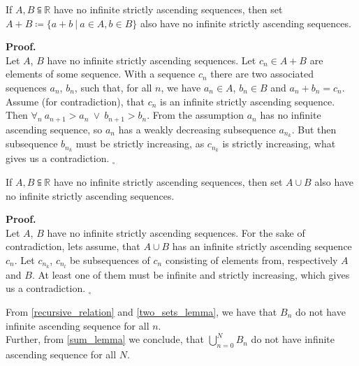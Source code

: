 \begin{lemma}\label{two_sets_lemma}
If $A, B \subseteqq \mathbb{R}$ have no infinite strictly ascending sequences, then set 
$A + B \coloneqq \{a+b\ |\ a \in A, b \in B\}$ also have no infinite strictly ascending sequences. 
\end{lemma}
\noindent\textbf{Proof.} \\
Let $A$, $B$ have no infinite strictly ascending sequences. 
Let $c_n \in A + B$ are elements of some sequence. With a sequence $c_n$ there are 
two associated sequences $a_n$, $b_n$, such that, for all $n$, we have $a_n \in A$, 
$b_n \in B$ and 
$a_n + b_n = c_n$. Assume (for contradiction), that $c_n$ is an infinite strictly 
ascending sequence. 
Then $\forall_n\ a_{n+1}>a_n\ \lor\ b_{n+1} > b_n$. From the assumption $a_n$ has no infinite 
ascending sequence, so $a_n$ has a weakly decreasing subsequence $a_{n_k}$. But then 
subsequence $b_{n_k}$ must be strictly increasing, as $c_{n_k}$ is strictly increasing, what gives 
us a contradiction. 
$_\square$ 

\begin{lemma}\label{sum_lemma}
If $A, B \subseteqq \mathbb{R}$ have no infinite strictly ascending sequences, then set 
$A \cup B$ also have no infinite strictly ascending sequences.
\end{lemma}
\textbf{Proof.} \\
Let $A$, $B$ have no infinite strictly ascending sequences. 
For the sake of contradiction, lets assume, that $A \cup B$ has an infinite strictly 
ascending sequence $c_n$. Let $c_{n_k}$, $c_{n_l}$ be subsequences of $c_n$ consisting 
of elements from, respectively $A$ and $B$. At least one of them must be infinite and 
strictly increasing, which gives us a contradiction. $_\square$ 

\begin{observation}\label{ascending_in_B_n}
From \ref{recursive_relation} and \ref{two_sets_lemma}, we have that $B_n$ do not have 
infinite ascending sequence for all $n$. \\
Further, from \ref{sum_lemma} we conclude, 
that $\bigcup\limits_{n=0}^N B_n$ do not have infinite ascending sequence for all $N$.
\end{observation}

